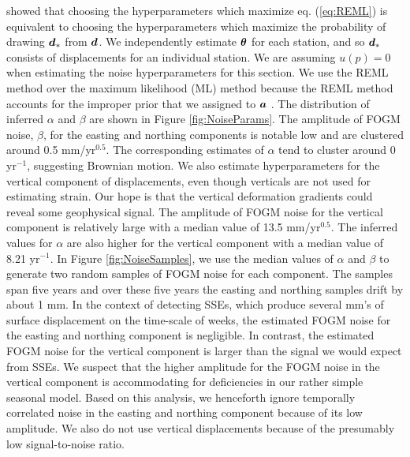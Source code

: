 \documentclass[extra,mreferee]{gji}
\begin{document}
\citet{Harville1974} showed that choosing the hyperparameters which maximize eq. (\ref{eq:REML}) is equivalent to choosing the hyperparameters which maximize the probability of drawing $\mitbf{d}_*$ from $\mitbf{d}$. We independently estimate $\mitbf{\theta}$ for each station, and so $\mitbf{d}_*$ consists of displacements for an individual station. We are assuming $u(p)=0$ when estimating the noise hyperparameters for this section. We use the REML method over the maximum likelihood (ML) method \citep[e.g.,][]{Langbein1997} because the REML method accounts for the improper prior that we assigned to $\mitbf{a}$ \citep{Hines2017}. The distribution of inferred $\alpha$ and $\beta$ are shown in Figure \ref{fig:NoiseParams}. The amplitude of FOGM noise, $\beta$, for the easting and northing components is notable low and are clustered around 0.5 mm/yr$^{0.5}$. The corresponding estimates of $\alpha$ tend to cluster around 0 yr$^{-1}$, suggesting Brownian motion. We also estimate hyperparameters for the vertical component of displacements, even though verticals are not used for estimating strain. Our hope is that the vertical deformation gradients could reveal some geophysical signal. The amplitude of FOGM noise for the vertical component is relatively large with a median value of 13.5 mm/yr$^{0.5}$.  The inferred values for $\alpha$ are also higher for the vertical component with a median value of 8.21 yr$^{-1}$. In Figure \ref{fig:NoiseSamples}, we use the median values of $\alpha$ and $\beta$ to generate two random samples of FOGM noise for each component. The samples span five years and over these five years the easting and northing samples drift by about 1 mm. In the context of detecting SSEs, which produce several mm's of surface displacement on the time-scale of weeks, the estimated FOGM noise for the easting and northing component is negligible. In contrast, the estimated FOGM noise for the vertical component is larger than the signal we would expect from SSEs. We suspect that the higher amplitude for the FOGM noise in the vertical component is accommodating for deficiencies in our rather simple seasonal model. Based on this analysis, we henceforth ignore temporally correlated noise in the easting and northing component because of its low amplitude. We also do not use vertical displacements because of the presumably low signal-to-noise ratio.
\end{document}
